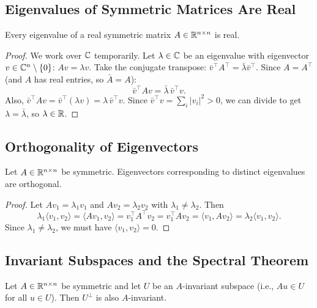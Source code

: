 \documentclass[11pt,a4paper]{article}
\begin{document}
\subsection{Eigenvalues of Symmetric Matrices Are Real}

\begin{lemma}
\label{lem:symmetric_real_eigen}
Every eigenvalue of a real symmetric matrix $A \in \mathbb{R}^{n \times n}$ is
real.
\end{lemma}

\begin{proof}
We work over $\mathbb{C}$ temporarily.  Let $\lambda \in \mathbb{C}$ be an eigenvalue
with eigenvector $v \in \mathbb{C}^n \setminus \{0\}$: $Av = \lambda v$.  Take
the conjugate transpose: $\bar{v}^\top A^\top = \bar{\lambda} \bar{v}^\top$.
Since $A = A^\top$ (and $A$ has real entries, so $\bar{A} = A$):
\[
  \bar{v}^\top A v = \bar{\lambda}\, \bar{v}^\top v.
\]
Also, $\bar{v}^\top A v = \bar{v}^\top (\lambda v) = \lambda\, \bar{v}^\top v$.
Since $\bar{v}^\top v = \sum_i |v_i|^2 > 0$, we can divide to get
$\lambda = \bar{\lambda}$, so $\lambda \in \mathbb{R}$.
\end{proof}

\subsection{Orthogonality of Eigenvectors}

\begin{lemma}
\label{lem:symmetric_orth_eigen}
Let $A \in \mathbb{R}^{n \times n}$ be symmetric.  Eigenvectors corresponding to
distinct eigenvalues are orthogonal.
\end{lemma}

\begin{proof}
Let $Av_1 = \lambda_1 v_1$ and $Av_2 = \lambda_2 v_2$ with
$\lambda_1 \neq \lambda_2$.  Then
\[
  \lambda_1 \langle v_1, v_2 \rangle
  = \langle Av_1, v_2 \rangle
  = v_1^\top A^\top v_2
  = v_1^\top A v_2
  = \langle v_1, Av_2 \rangle
  = \lambda_2 \langle v_1, v_2 \rangle.
\]
Since $\lambda_1 \neq \lambda_2$, we must have
$\langle v_1, v_2 \rangle = 0$.
\end{proof}

\subsection{Invariant Subspaces and the Spectral Theorem}

\begin{lemma}
\label{lem:symmetric_invariant}
Let $A \in \mathbb{R}^{n \times n}$ be symmetric and let $U$ be an
$A$-invariant subspace (i.e., $Au \in U$ for all $u \in U$).  Then
$U^\perp$ is also $A$-invariant.
\end{lemma}
\end{document}
